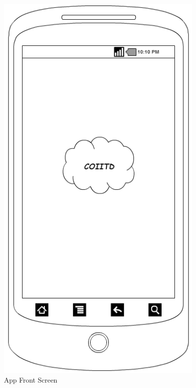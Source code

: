 \documentclass[12pt]{article}
\begin{document}
    \begin{figure}[H]
    \begin{minipage}{.5\textwidth}
      \centering
      \includegraphics[width=0.9\textwidth]{./appMockUp/appFrontScreen}
      \caption{App Front Screen}
      \label{fig:appFrontScreen}
    \end{minipage}%
    \begin{minipage}{.5\textwidth}
      \centering

\end{minipage}
\end{figure}
\end{document}
